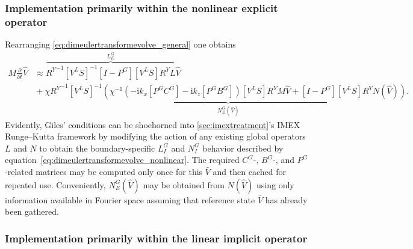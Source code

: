 \documentclass[letterpaper,11pt,nointlimits,reqno,draft]{amsbook}
\newcommand{\ii}{\ensuremath{\mathrm{i}}}
\begin{document}

\subsubsection{Implementation primarily within the nonlinear explicit operator}
\label{sec:nrbc_mostly_explicit}

Rearranging \eqref{eq:dimeulertransformevolve_general} one obtains
\begin{align}
\label{eq:dimeulertransformevolve_nonlinear}
  M \frac{\partial}{\partial{}t}
  \hat{V}
&\approx
\overbrace{
  {R^Y}^{-1}
  \left[V^L S\right]^{-1}
  \left[I-P^G\right] \left[V^L S\right] R^Y
  L
}^{L_E^G}
  \hat{V}
\\
&{}+
  \chi
\underbrace{
  {R^Y}^{-1}
  \left[V^L S\right]^{-1}
  \left(
    \chi^{-1}
    \left(- \ii k_x \left[P^G C^G\right] - \ii k_z \left[P^G B^G\right] \right)
    \left[V^L S\right] R^Y M
    \hat{V}
    +
    \left[I - P^G\right] \left[V^L S\right] R^Y
    N(\hat{V})
  \right)
}_{N_E^G\left(\hat{V}\right)}
.
\end{align}
Evidently, Giles' conditions can be shoehorned into
\autoref{sec:imextreatment}'s IMEX Runge--Kutta framework by modifying the
action of any existing global operators $L$ and $N$ to obtain the
boundary-specific $L_I^G$ and $N_I^G$ behavior described by
equation~\eqref{eq:dimeulertransformevolve_nonlinear}. The required $C^G$-,
$B^G$-, and $P^G$-related matrices may be computed only once for this $\bar{V}$
and then cached for repeated use.  Conveniently, $N_E^G\left(\hat{V}\right)$ may
be obtained from $N\left(\hat{V}\right)$ using only information available in
Fourier space assuming that reference state $\bar{V}$ has already been gathered.

\subsubsection{Implementation primarily within the linear implicit operator}
\label{sec:nrbc_mostly_implicit}
\end{document}
